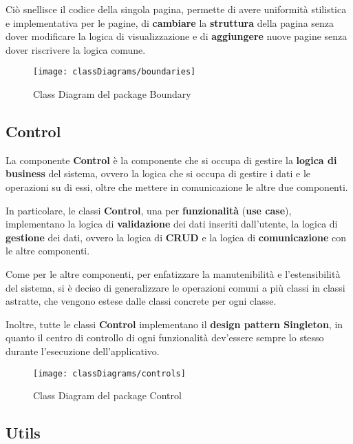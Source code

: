 Ciò snellisce il codice della singola pagina, permette di avere uniformità stilistica 
e implementativa per le pagine, di \textbf{cambiare} la \textbf{struttura}
della pagina senza dover modificare la logica di visualizzazione e di \textbf{aggiungere} nuove
pagine senza dover riscrivere la logica comune.

\begin{figure}[H]
  \centering
  \texttt{[image: classDiagrams/boundaries]}
  \caption{Class Diagram del package Boundary}
\end{figure}

\newpage

\subsection{Control}

La componente \textbf{Control} è la componente che si occupa di gestire la \textbf{logica di
business} del sistema, ovvero la logica che si occupa di gestire i dati e le operazioni
su di essi, oltre che mettere in comunicazione le altre due componenti.

In particolare, le classi \textbf{Control}, una per \textbf{funzionalità} (\textbf{use case}),
implementano la logica di \textbf{validazione} dei dati inseriti dall'utente, 
la logica di \textbf{gestione} dei dati, ovvero la logica di \textbf{CRUD} e 
la logica di \textbf{comunicazione} con le altre componenti.

Come per le altre componenti, per enfatizzare la manutenibilità e l'estensibilità del sistema,
si è deciso di generalizzare le operazioni comuni a più classi in classi astratte, che
vengono estese dalle classi concrete per ogni classe.

Inoltre, tutte le classi \textbf{Control} implementano il \textbf{design pattern Singleton},
in quanto il centro di controllo di ogni funzionalità dev'essere sempre lo stesso durante
l'esecuzione dell'applicativo.


\begin{figure}[H]
  \centering
  \texttt{[image: classDiagrams/controls]}
  \caption{Class Diagram del package Control}
\end{figure}

\newpage

\subsection{Utils}

